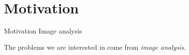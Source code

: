 \section{Motivation}

\begin{frame}
	{Motivation}	
	{Image analysis}

\begin{minipage}[t][0.5\textheight][t]{1\textwidth}
The problems we are interested in come from \emph{image analysis}.
\vspace{1em}



\end{minipage}
\end{frame}
